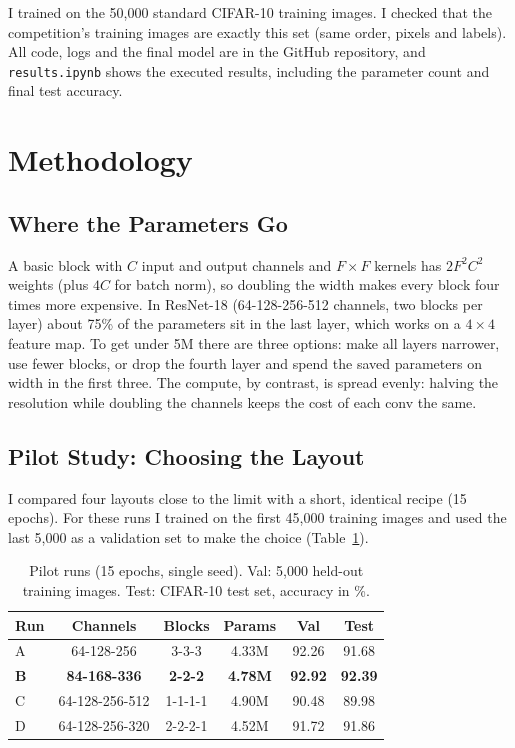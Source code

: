 \documentclass[letterpaper]{article}
\begin{document}
I trained on the 50,000 standard CIFAR-10 training images. I checked that the competition's training images are
exactly this set (same order, pixels and labels). All code, logs and the final model are in the GitHub repository,
and \texttt{results.ipynb} shows the executed results, including the parameter count and final test accuracy.

\section{Methodology}

\subsection{Where the Parameters Go}
A basic block with $C$ input and output channels and $F\times F$ kernels has $2F^2C^2$ weights (plus $4C$ for batch
norm), so doubling the width makes every block four times more expensive. In ResNet-18 (64-128-256-512 channels,
two blocks per layer) about 75\% of the parameters sit in the last layer, which works on a $4\times4$ feature map.
To get under 5M there are three options: make all layers narrower, use fewer blocks, or drop the fourth layer and
spend the saved parameters on width in the first three. The compute, by contrast, is spread evenly: halving the
resolution while doubling the channels keeps the cost of each conv the same.

\subsection{Pilot Study: Choosing the Layout}
I compared four layouts close to the limit with a short, identical recipe (15 epochs). For these runs I trained on
the first 45,000 training images and used the last 5,000 as a validation set to make the choice (Table~\ref{tab:pilot}).

\begin{table}[t]
\centering
\small
\begin{tabular}{lccccc}
\toprule
Run & Channels & Blocks & Params & Val & Test \\
\midrule
A & 64-128-256 & 3-3-3 & 4.33M & 92.26 & 91.68 \\
\textbf{B} & \textbf{84-168-336} & \textbf{2-2-2} & \textbf{4.78M} & \textbf{92.92} & \textbf{92.39} \\
C & 64-128-256-512 & 1-1-1-1 & 4.90M & 90.48 & 89.98 \\
D & 64-128-256-320 & 2-2-2-1 & 4.52M & 91.72 & 91.86 \\
\bottomrule
\end{tabular}
\caption{Pilot runs (15 epochs, single seed). Val: 5,000 held-out training images. Test: CIFAR-10 test set,
accuracy in \%.}
\label{tab:pilot}
\end{table}
\end{document}
